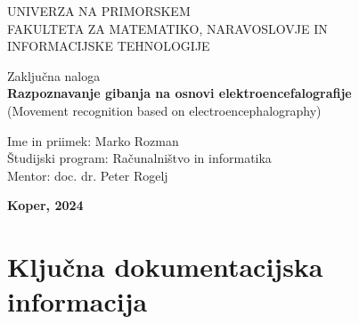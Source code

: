 \documentclass[12pt,a4paper,titlepage,openany]{report}
\begin{document}
\pagestyle{empty}
\begin{center}
\noindent \large UNIVERZA NA PRIMORSKEM\\
\large FAKULTETA ZA MATEMATIKO, NARAVOSLOVJE IN\\
INFORMACIJSKE TEHNOLOGIJE


\normalsize
\vspace{6cm}
Zaključna naloga\\
\textbf{\large Razpoznavanje gibanja na osnovi elektroencefalografije}\\
\normalsize
(Movement recognition based on electroencephalography)\\
\end{center}

\begin{flushleft}
\vspace{5cm}
\noindent Ime in priimek: Marko Rozman
\\
\noindent Študijski program: Računalništvo in informatika
\\
\noindent Mentor: doc. dr. Peter Rogelj 

\end{flushleft}

\vspace{4cm}
\begin{center}
\large \textbf{Koper, 2024}
\end{center}
\newpage

\pagestyle{fancy}

\section*{Ključna dokumentacijska informacija}
\end{document}
